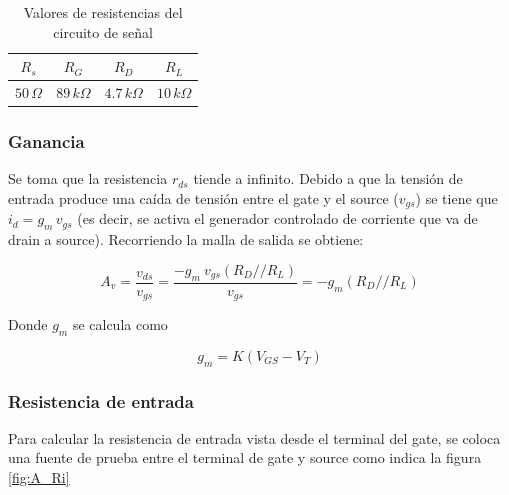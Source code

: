 \documentclass[10pt,spanish,a4paper,notitlepage]{article}
\begin{document}
\begin{table}[H]
\centering
\begin{tabular}{|c|c|c|c|} %
\hline
$R_{s}$ & $R_{G}$ & $R_{D}$ & $R_{L}$  \\ \hline
$50\,\unit{\Omega}$ & $89\,\unit{k\Omega}$ & $4.7\,\unit{k\Omega}$  & $10\,\unit{k\Omega}$ \\ \hline
\end{tabular}
\caption{Valores de resistencias del circuito de señal}
\label{table:A_senal}
\end{table}

\subsubsection{Ganancia}

Se toma que la resistencia $r_{ds}$ tiende a infinito. Debido a que la tensión de entrada produce una caída de tensión entre el gate y el source ($v_{gs}$) se tiene que $i_d=g_m\, v_{gs}$ (es decir, se activa el generador controlado de corriente que va de drain a source). Recorriendo la malla de salida se obtiene:


\begin{equation}
    A_v=\frac{v_{ds}}{v_{gs}}=\frac{-g_{m}\ v_{gs}(R_D//R_L)}{v_{gs} }=-g_m(R_D//R_L)
    \label{eq:A_Av}
\end{equation}

Donde $g_{m}$ se calcula como 

\begin{equation}
    g_m= K (V_{GS} - V_T)
    \label{eq:A_gm}
\end{equation}


\subsubsection{Resistencia de entrada}
Para calcular la resistencia de entrada vista desde el terminal del gate, se coloca una fuente de prueba entre el terminal de gate y source como indica la figura \ref{fig:A_Ri}
\end{document}
